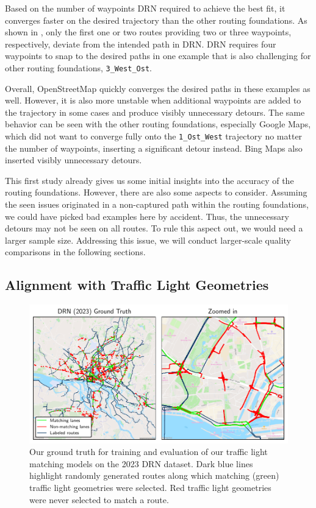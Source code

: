 Based on the number of waypoints DRN required to achieve the best fit, it converges faster on the desired trajectory than the other routing foundations. As shown in , only the first one or two routes providing two or three waypoints, respectively, deviate from the intended path in DRN. DRN requires four waypoints to snap to the desired paths in one example that is also challenging for other routing foundations, \texttt{3\_West\_Ost}.

Overall, OpenStreetMap quickly converges the desired paths in these examples as well. However, it is also more unstable when additional waypoints are added to the trajectory in some cases and produce visibly unnecessary detours. The same behavior can be seen with the other routing foundations, especially Google Maps, which did not want to converge fully onto the \texttt{1\_Ost\_West} trajectory no matter the number of waypoints, inserting a significant detour instead. Bing Maps also inserted visibly unnecessary detours. 

This first study already gives us some initial insights into the accuracy of the routing foundations. However, there are also some aspects to consider. Assuming the seen issues originated in a non-captured path within the routing foundations, we could have picked bad examples here by accident. Thus, the unnecessary detours may not be seen on all routes. To rule this aspect out, we would need a larger sample size. Addressing this issue, we will conduct larger-scale quality comparisons in the following sections.

\subsection{Alignment with Traffic Light Geometries} \label{sec:lorenz4}

\begin{figure}[t]
\centering 
\includegraphics[width=\linewidth]{images/matching-ground-truth-drn.pdf}
\caption{Our ground truth for training and evaluation of our traffic light matching models on the 2023 DRN dataset. Dark blue lines highlight randomly generated routes along which matching (green) traffic light geometries were selected. Red traffic light geometries were never selected to match a route.}
\label{fig:matching-ground-truth-drn}
\end{figure}

